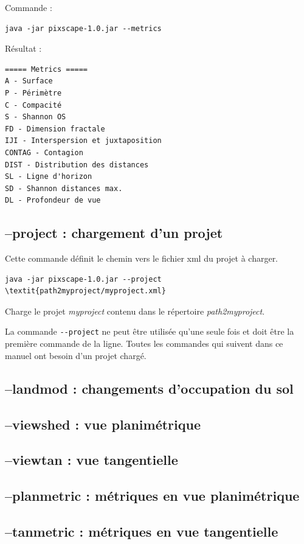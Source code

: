 \documentclass{report}
\begin{document}
Commande :
\begin{Verbatim}
java -jar pixscape-1.0.jar --metrics
\end{Verbatim}
Résultat :
\begin{Verbatim}
===== Metrics =====
A - Surface
P - Périmètre
C - Compacité
S - Shannon OS
FD - Dimension fractale
IJI - Interspersion et juxtaposition
CONTAG - Contagion
DIST - Distribution des distances
SL - Ligne d'horizon
SD - Shannon distances max.
DL - Profondeur de vue
\end{Verbatim}

\subsection{--project : chargement d'un projet}
Cette commande définit le chemin vers le fichier xml du projet à charger.
\begin{Verbatim}[commandchars=\\\{\}]
java -jar pixscape-1.0.jar --project \textit{path2myproject/myproject.xml}
\end{Verbatim}
Charge le projet \textit{myproject} contenu dans le répertoire \textit{path2myproject}.

La commande \verb|--project| ne peut être utilisée qu'une seule fois et doit être la première commande de la ligne.
Toutes les commandes qui suivent dans ce manuel ont besoin d'un projet chargé.

\subsection{--landmod : changements d'occupation du sol}

\subsection{--viewshed : vue planimétrique}

\subsection{--viewtan : vue tangentielle}

\subsection{--planmetric : métriques en vue planimétrique}

\subsection{--tanmetric : métriques en vue tangentielle}
\end{document}
